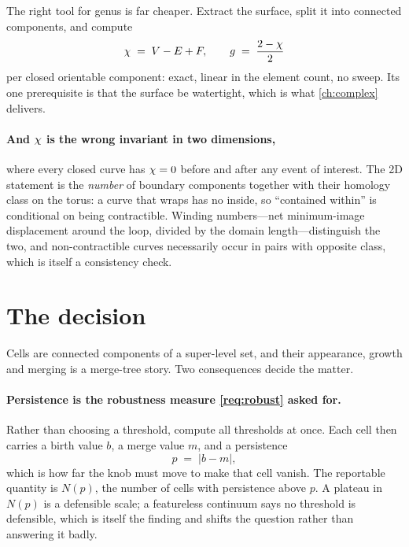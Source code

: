 The right tool for genus is far cheaper. Extract the surface, split it into
connected components, and compute
\begin{equation}
  \chi \;=\; V - E + F, \qquad g \;=\; \frac{2 - \chi}{2}
  \label{eq:euler}
\end{equation}
per closed orientable component: exact, linear in the element count, no sweep.
Its one prerequisite is that the surface be watertight, which is what
\cref{ch:complex} delivers.

\paragraph{And $\chi$ is the wrong invariant in two dimensions,} where every
closed curve has $\chi = 0$ before and after any event of interest. The 2D
statement is the \emph{number} of boundary components together with their
homology class on the torus: a curve that wraps has no inside, so ``contained
within'' is conditional on being contractible. Winding numbers---net minimum-image
displacement around the loop, divided by the domain length---distinguish the two,
and non-contractible curves necessarily occur in pairs with opposite class,
which is itself a consistency check.

\section{The decision}
\label{sec:decision}

Cells are connected components of a super-level set, and their appearance,
growth and merging is a merge-tree story. Two consequences decide the matter.

\paragraph{Persistence is the robustness measure \ref{req:robust} asked for.}
Rather than choosing a threshold, compute all thresholds at once. Each cell then
carries a birth value $b$, a merge value $m$, and a persistence
\begin{equation}
  p \;=\; |b - m|,
  \label{eq:persistence}
\end{equation}
which is how far the knob must move to make that cell vanish. The reportable
quantity is $N(p)$, the number of cells with persistence above $p$. A plateau in
$N(p)$ is a defensible scale; a featureless continuum says no threshold is
defensible, which is itself the finding and shifts the question rather than
answering it badly.

